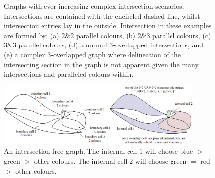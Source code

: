 \documentclass[journal]{IEEEtran}
\begin{document}
\begin{figure}[t]
\centering
{}
\caption{Graphs with ever increasing complex intersection scenarios. 
Intersections are contained with the encircled dashed line, whilst intersection entries lay in the outside. 
Intersection in these examples are formed by: (a) $2\&2$ parallel colours, (b) $2\&3$ parallel colours, (c) $3\&3$ parallel colours, 
(d) a normal $3$-overlapped intersections, and (e) a complex $3$-overlapped graph where delineation of the intersecting section in the graph 
is not apparent given the many intersections and paralleled colours within.}
\label{fig:three_overlapped_graph}
\end{figure}


\begin{figure}[t]
\centering
\includegraphics[width=0.9\textwidth]{figures/characteristic_string_2}
\caption{An intersection-free graph. The internal cell $1$ will choose blue $>$ green $>$ other colours. The internal cell $2$ will choose green $=$ red $>$ other colours.}\label{fig:characteristic_string}
\end{figure}
\end{document}
